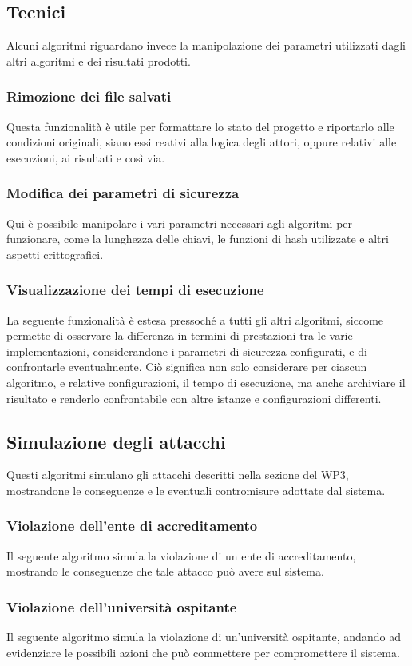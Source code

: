 \documentclass[a4paper,12pt]{article}
\begin{document}
\subsection{Tecnici}
Alcuni algoritmi riguardano invece la manipolazione dei parametri utilizzati dagli altri algoritmi e dei risultati prodotti.
\subsubsection{Rimozione dei file salvati}
Questa funzionalità è utile per formattare lo stato del progetto e riportarlo alle condizioni originali, siano essi reativi alla logica degli attori, oppure relativi alle esecuzioni, ai risultati e così via.
\subsubsection{Modifica dei parametri di sicurezza}
Qui è possibile manipolare i vari parametri necessari agli algoritmi per funzionare, come la lunghezza delle chiavi, le funzioni di hash utilizzate e altri aspetti crittografici.
\subsubsection{Visualizzazione dei tempi di esecuzione}
La seguente funzionalità è estesa pressoché a tutti gli altri algoritmi, siccome permette di osservare la differenza in termini di prestazioni tra le varie implementazioni, considerandone i parametri di sicurezza configurati, e di confrontarle eventualmente. Ciò significa non solo considerare per ciascun algoritmo, e relative configurazioni, il tempo di esecuzione, ma anche archiviare il risultato e renderlo confrontabile con altre istanze e configurazioni differenti.
\subsection{Simulazione degli attacchi}
Questi algoritmi simulano gli attacchi descritti nella sezione del WP3, mostrandone le conseguenze e le eventuali contromisure adottate dal sistema.
\subsubsection{Violazione dell'ente di accreditamento}
Il seguente algoritmo simula la violazione di un ente di accreditamento, mostrando le conseguenze che tale attacco può avere sul sistema.
\subsubsection{Violazione dell'università ospitante}
Il seguente algoritmo simula la violazione di un'università ospitante, andando ad evidenziare le possibili azioni che può commettere per compromettere il sistema.
\end{document}
